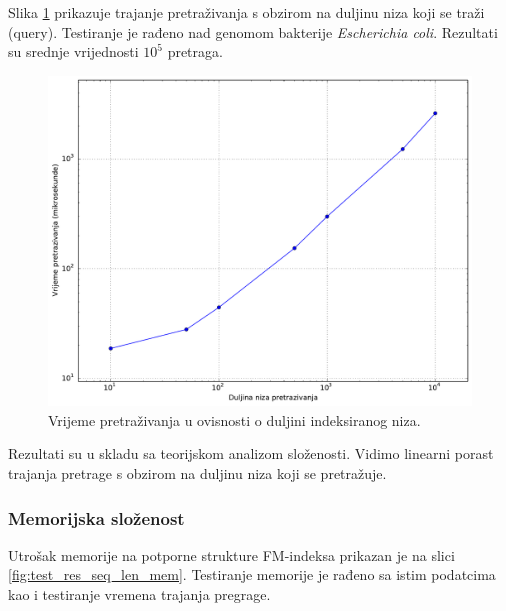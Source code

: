 \documentclass[times, utf8, seminar, numeric]{fer}
\begin{document}
Slika \ref{fig:test_res_query_len_time} prikazuje trajanje pretraživanja
s obzirom na duljinu niza koji se traži (query). Testiranje je rađeno nad genomom
bakterije \textit{Escherichia coli}. Rezultati su srednje vrijednosti $10^5$ pretraga.

\begin{figure}[!htb]
\centering
\includegraphics[width=\textwidth]{fig/test_res_query_len.pdf}
\caption{Vrijeme pretraživanja u ovisnosti o duljini indeksiranog niza.}
\label{fig:test_res_query_len_time}
\end{figure}

Rezultati su u skladu sa teorijskom analizom složenosti. Vidimo linearni porast
trajanja pretrage s obzirom na duljinu niza koji se pretražuje.

\subsubsection{Memorijska složenost}

Utrošak memorije na potporne strukture FM-indeksa prikazan je na slici \ref{fig:test_res_seq_len_mem}.
Testiranje memorije je rađeno sa istim podatcima kao i testiranje vremena trajanja pregrage.
\end{document}
